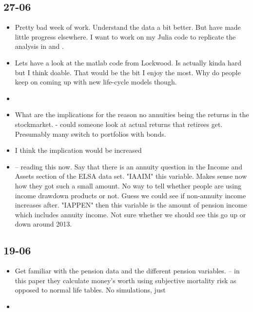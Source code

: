 \documentclass[12pt]{article}
\begin{document}
\subsection{\textbf{27-06}}
\begin{itemize}
  \item Pretty bad week of work. Understand the data a bit better.
        But have made little progress elsewhere. I want to work on my Julia code
        to replicate the analysis in \cite{odea_sturrock_rest_2023} and \cite{lockwood_red_2012}.

  \item Lets have a look at the matlab code from Lockwood. Is actually kinda hard but I think doable.
        That would be the bit I enjoy the most.
        Why do people keep on coming up with new life-cycle models though.
  \item
  \item What are the implications for the reason no annuities being the returns in the stockmarket.
        - could someone look at actual returns that retirees get. Presumably many switch to portfolios with bonds.

  \item I think the implication would be increased
  \item \cite{inkman_et_al_rfs_2011} -- reading this now. Say that there is an annuity question in the
        Income and Assets section of the ELSA data set. "IAAIM" this variable. Makes sense now how they got
        such a small amount. No way to tell whether people are using income drawdown products or not.
        Guess we could see if non-annuity income increases after.  "IAPPEN" then this variable is the amount of
        pension income which includes annuity income. Not sure whether we should see this go up or down around 2013.

\end{itemize}

\subsection{\textbf{19-06}}
\begin{itemize}
  \item Get familiar with the pension data and the different pension variables. \cite{odea_sturrock_rest_2023} -- in this paper they calculate money's
        worth using subjective mortality risk as opposed to normal life tables. No simulations, just
  \item
\end{itemize}
\end{document}
